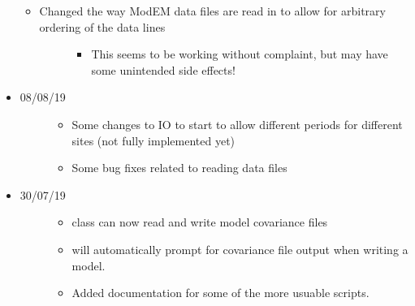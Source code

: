 \documentclass[letterpaper,10pt,english]{sphinxmanual}
\begin{document}
\begin{itemize}
\begin{itemize}
\end{itemize}
\begin{itemize}
\item {} \begin{description}
\item[{Changed the way ModEM data files are read in to allow for arbitrary ordering of the data lines}] \leavevmode\begin{itemize}
\item {} 
This seems to be working without complaint, but may have some unintended side effects!

\end{itemize}

\end{description}

\end{itemize}

\item {} \begin{description}
\item[{08/08/19}] \leavevmode\begin{itemize}
\item {} 
Some changes to IO to start to allow different periods for different sites (not fully implemented yet)

\item {} 
Some bug fixes related to reading data files

\end{itemize}

\end{description}

\item {} \begin{description}
\item[{30/07/19}] \leavevmode\begin{itemize}
\item {} 
{\hyperref[\detokenize{content/api_core/data_structures:model}]{}} class can now read and write model covariance files

\item {} 
{\hyperref[\detokenize{content/mesh_designer/main_window:mesh-designer}]{}} will automatically prompt for covariance file output when writing a model.

\item {} 
Added documentation for some of the more usuable scripts.


\end{itemize}
\end{description}
\end{itemize}
\end{document}
